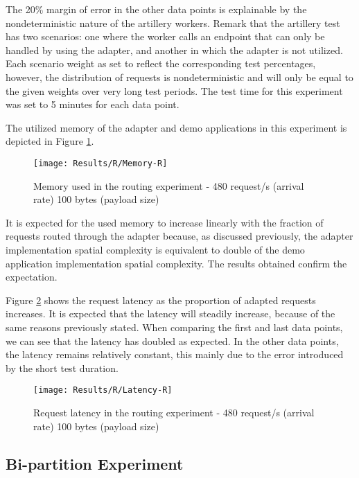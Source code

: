 The 20\% margin of error in the other data points is explainable by the nondeterministic nature of the artillery workers.
Remark that the artillery test has two scenarios: one where the worker calls an endpoint that can only be handled by using the adapter, and another in which the adapter is not utilized.
Each scenario weight as set to reflect the corresponding test percentages,
however, the distribution of requests is nondeterministic and will only be equal to the given weights over very long test periods.
The test time for this experiment was set to 5 minutes for each data point.

The utilized memory of the adapter and demo applications in this experiment is depicted in Figure \ref{fig:routMem}.

\begin{figure}[htbp]
    \centering
    \centerline{\texttt{[image: Results/R/Memory-R]}}
    \caption{Memory used in the routing experiment - 480 request/s (arrival rate) 100 bytes (payload size)}
    \label{fig:routMem}
\end{figure}

It is expected for the used memory to increase linearly with the fraction of requests routed through the adapter because, as discussed previously,
the adapter implementation spatial complexity is equivalent to double of the demo application implementation spatial complexity.
The results obtained confirm the expectation.

Figure \ref{fig:routLatency} shows the request latency as the proportion of adapted requests increases.
It is expected that the latency will steadily increase, because of the same reasons previously stated.
When comparing the first and last data points, we can see that the latency has doubled as expected.
In the other data points, the latency remains relatively constant, this mainly due to the error introduced by the short test duration.

\begin{figure}[htbp]
    \centering
    \centerline{\texttt{[image: Results/R/Latency-R]}}
    \caption{Request latency in the routing experiment - 480 request/s (arrival rate) 100 bytes (payload size)}
    \label{fig:routLatency}
\end{figure}

\subsection{Bi-partition Experiment}

